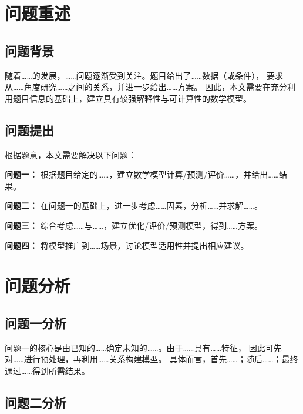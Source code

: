 \documentclass[UTF8,fontset=none,a4paper,12pt]{ctexart}
\begin{document}
\section{问题重述}

\subsection{问题背景}

随着……的发展，……问题逐渐受到关注。题目给出了……数据（或条件），
要求从……角度研究……之间的关系，并进一步给出……方案。
因此，本文需要在充分利用题目信息的基础上，建立具有较强解释性与可计算性的数学模型。


\subsection{问题提出}

根据题意，本文需要解决以下问题：

\textbf{问题一：} 根据题目给定的……，建立数学模型计算/预测/评价……，并给出……结果。

\textbf{问题二：} 在问题一的基础上，进一步考虑……因素，分析……并求解……。

\textbf{问题三：} 综合考虑……与……，建立优化/评价/预测模型，得到……方案。

\textbf{问题四：} 将模型推广到……场景，讨论模型适用性并提出相应建议。


\section{问题分析}

\subsection{问题一分析}

问题一的核心是由已知的……确定未知的……。由于……具有……特征，
因此可先对……进行预处理，再利用……关系构建模型。
具体而言，首先……；随后……；最终通过……得到所需结果。

\subsection{问题二分析}
\end{document}
